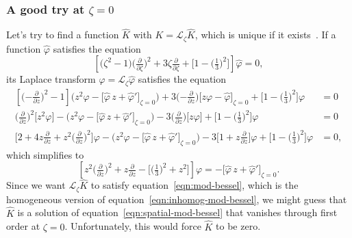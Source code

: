 \documentclass{article}
\newcommand{\laplace}{\mathcal{L}}
\begin{document}
\subsubsection{A good try at $\zeta = 0$}
Let's try to find a function $\hat{K}$ with $K = \laplace_\zeta \hat{K}$, which is unique if it exists~\cite[Theorem~1.23]{laplace-tfm}. If a function $\hat{\varphi}$ satisfies the equation
\begin{equation}\label{eqn:spatial-mod-bessel}
\left[\big(\zeta^2 - 1\big) \big(\tfrac{\partial}{\partial \zeta}\big)^2 + 3\zeta \tfrac{\partial}{\partial \zeta} + \big[1 - \big(\tfrac{1}{3}\big)^2\big]\right] \hat{\varphi} = 0,
\end{equation}
its Laplace transform $\varphi = \laplace_\zeta \hat{\varphi}$ satisfies the equation
\begin{align*}
\left[\big({-\tfrac{\partial}{\partial z}}\big)^2 - 1\right] \Big(z^2 \varphi - \big[\hat{\varphi}\,z + \hat{\varphi}'\big]_{\zeta = 0}\Big) + 3\big({-\tfrac{\partial}{\partial z}}\big)\big[z\varphi - \hat{\varphi}\big]_{\zeta = 0} + \big[1 - \big(\tfrac{1}{3}\big)^2\big] \varphi & = 0 \\
\big(\tfrac{\partial}{\partial z}\big)^2 \big[z^2 \varphi\big] - \Big(z^2 \varphi - \big[\hat{\varphi}\,z + \hat{\varphi}'\big]_{\zeta = 0}\Big) - 3\big(\tfrac{\partial}{\partial z}\big)\big[z\varphi\big] + \big[1 - \big(\tfrac{1}{3}\big)^2\big] \varphi & = 0 \\
\Big[2 + 4z\tfrac{\partial}{\partial z} + z^2\big(\tfrac{\partial}{\partial z}\big)^2\Big]\varphi - \Big(z^2 \varphi - \big[\hat{\varphi}\,z + \hat{\varphi}'\big]_{\zeta = 0}\Big) - 3\Big[1 + z\tfrac{\partial}{\partial z}\Big]\varphi + \big[1 - \big(\tfrac{1}{3}\big)^2\big] \varphi & = 0,
\end{align*}
which simplifies to
\begin{equation}\label{eqn:inhomog-mod-bessel}
\left[z^2 \big(\tfrac{\partial}{\partial z}\big)^2 + z \tfrac{\partial}{\partial z} - \big[\big(\tfrac{1}{3}\big)^2 + z^2\big]\right] \varphi = -\big[\hat{\varphi}\,z + \hat{\varphi}'\big]_{\zeta = 0}.
\end{equation}
Since we want $\laplace_\zeta \hat{K}$ to satisfy equation~\ref{eqn:mod-bessel}, which is the homogeneous version of equation~\ref{eqn:inhomog-mod-bessel}, we might guess that $\hat{K}$ is a solution of equation~\ref{eqn:spatial-mod-bessel} that vanishes through first order at $\zeta = 0$. Unfortunately, this would force $\hat{K}$ to be zero.
\end{document}
